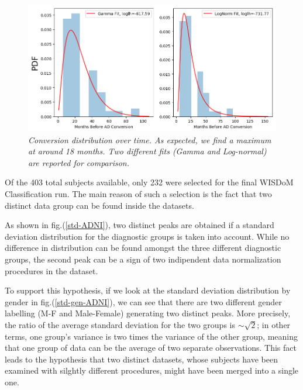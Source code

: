 \documentclass[12pt,openright,twoside,a4paper]{book}
\begin{document}
\begin{figure}[!h]
\centering
\includegraphics[scale=0.65]{conv-comp}
\caption{\textit{Conversion distribution over time. As expected, we find a maximum at around 18 months. Two different fits (Gamma and Log-normal) are reported for comparison.}}
\label{conv-comp}
\end{figure}

Of the 403 total subjects available, only 232 were selected for the final WISDoM Classification run.
The main reason of such a selection is the fact that two distinct data group can be found inside the datasets.

As shown in fig.(\ref{std-ADNI}), two distinct peaks are obtained if a standard deviation distribution for the diagnostic groups is taken into account.
While no difference in distribution can be found amongst the three different diagnostic groups, the second peak can be a sign of two indipendent data normalization procedures in the dataset.

To support this hypothesis, if we look at the standard deviation distribution by gender in fig.(\ref{std-gen-ADNI}), we can see that there are two different gender labelling (M-F and Male-Female) generating two distinct peaks. 
More precisely, the ratio of the average standard deviation for the two groups is $\sim \sqrt{2}$; in other terms, one group's variance is two times the variance of the other group, meaning that one group of data can be the average of two separate observations.
This fact leads to the hypothesis that two distinct datasets, whose subjects have been examined with silghtly different procedures, might have been merged into a single one.
\end{document}
